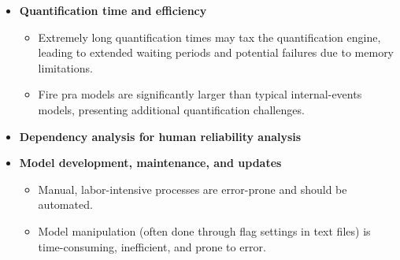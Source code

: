 \begin{itemize}
\item \textbf{Quantification time and efficiency}
\begin{itemize}
\item Extremely long quantification times may tax the quantification engine, leading to extended waiting periods and potential failures due to memory limitations.
\item Fire \acrshort{pra} models are significantly larger than typical internal-events models, presenting additional quantification challenges.
\end{itemize}

\item \textbf{Dependency analysis for human reliability analysis}

\item \textbf{Model development, maintenance, and updates}
\begin{itemize}
    \item Manual, labor-intensive processes are error-prone and should be automated.
    \item Model manipulation (often done through flag settings in text files) is time-consuming, inefficient, and prone to error.
\end{itemize}


\end{itemize}

